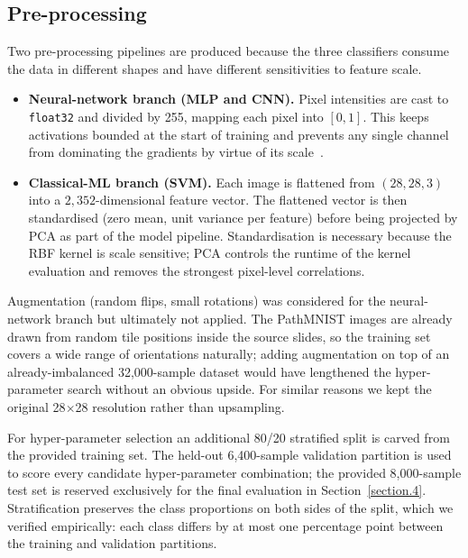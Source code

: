 \documentclass[../main.tex]{subfiles}
\begin{document}
\subsection{Pre-processing}
\noindent
Two pre-processing pipelines are produced because the three classifiers
consume the data in different shapes and have different sensitivities to
feature scale.

\begin{itemize}
    \item \textbf{Neural-network branch (\gls{MLP} and \gls{CNN}).} Pixel
    intensities are cast to \texttt{float32} and divided by 255, mapping
    each pixel into $[0, 1]$. This keeps activations bounded at the start
    of training and prevents any single channel from dominating the
    gradients by virtue of its scale~\cite{lecun2012efficient}.
    \item \textbf{Classical-ML branch (\gls{SVM}).} Each image is flattened
    from $(28, 28, 3)$ into a $2{,}352$-dimensional feature vector. The
    flattened vector is then standardised (zero mean, unit variance per
    feature) before being projected by \gls{PCA} as part of the model
    pipeline. Standardisation is necessary because the \gls{RBF} kernel is
    scale sensitive; \gls{PCA} controls the runtime of the kernel
    evaluation and removes the strongest pixel-level correlations.
\end{itemize}

\noindent
Augmentation (random flips, small rotations) was considered for the
neural-network branch but ultimately not applied. The PathMNIST images are
already drawn from random tile positions inside the source slides, so the
training set covers a wide range of orientations naturally; adding
augmentation on top of an already-imbalanced 32{,}000-sample dataset would
have lengthened the hyper-parameter search without an obvious upside. For
similar reasons we kept the original 28$\times$28 resolution rather than
upsampling.

\noindent
For hyper-parameter selection an additional 80/20 stratified split is
carved from the provided training set. The held-out 6{,}400-sample
validation partition is used to score every candidate hyper-parameter
combination; the provided 8{,}000-sample test set is reserved exclusively
for the final evaluation in Section~\ref{section.4}. Stratification preserves
the class proportions on both sides of the split, which we verified
empirically: each class differs by at most one percentage point between the
training and validation partitions.
\end{document}
